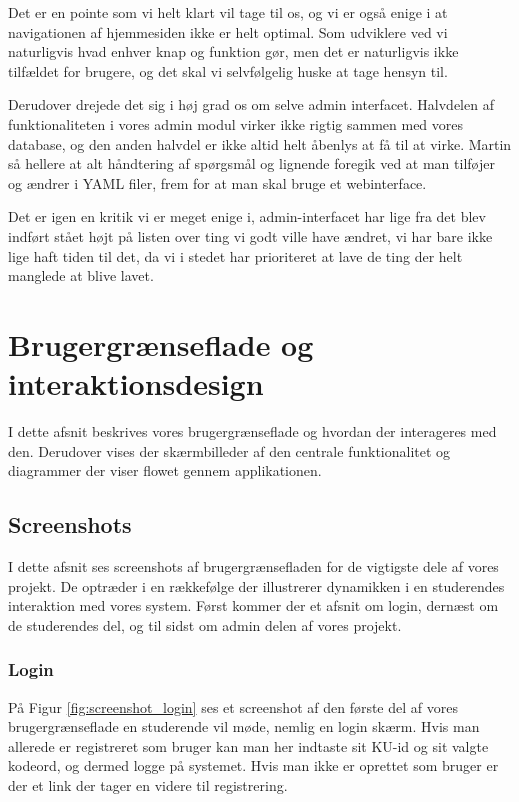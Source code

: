 \documentclass[11pt, a4paper]{article}
\begin{document}
Det er en pointe som vi helt klart vil tage til os, og vi er også enige i at navigationen af hjemmesiden ikke er helt optimal. Som udviklere ved vi naturligvis hvad enhver knap og funktion gør, men det er naturligvis ikke tilfældet for brugere, og det skal vi selvfølgelig huske at tage hensyn til.

Derudover drejede det sig i høj grad os om selve admin interfacet. Halvdelen af funktionaliteten i vores admin modul virker ikke rigtig sammen med vores database, og den anden halvdel er ikke altid helt åbenlys at få til at virke. Martin så hellere at alt håndtering af spørgsmål og lignende foregik ved at man tilføjer og ændrer i YAML filer, frem for at man skal bruge et webinterface.

Det er igen en kritik vi er meget enige i, admin-interfacet har lige fra det blev indført stået højt på listen over ting vi godt ville have ændret, vi har bare ikke lige haft tiden til det, da vi i stedet har prioriteret at lave de ting der helt manglede at blive lavet.

\section{Brugergrænseflade og interaktionsdesign}
\label{sec:userinterface}

I dette afsnit beskrives vores brugergrænseflade og hvordan der interageres med den. Derudover vises der skærmbilleder af den centrale funktionalitet og diagrammer der viser flowet gennem applikationen.

\subsection{Screenshots}
\label{sub:screenshots}
I dette afsnit ses screenshots af brugergrænsefladen for de vigtigste dele af vores projekt. De optræder i en rækkefølge der illustrerer dynamikken i en studerendes interaktion med vores system. Først kommer der et afsnit om login, dernæst om de studerendes del, og til sidst om admin delen af vores projekt.

\subsubsection{Login}
\label{subsub:screenshots_login}
På Figur \ref{fig:screenshot_login} ses et screenshot af den første del af vores brugergrænseflade en studerende vil møde, nemlig en login skærm. Hvis man allerede er registreret som bruger kan man her indtaste sit KU-id og sit valgte kodeord, og dermed logge på systemet. Hvis man ikke er oprettet som bruger er der et link der tager en videre til registrering.
\end{document}
